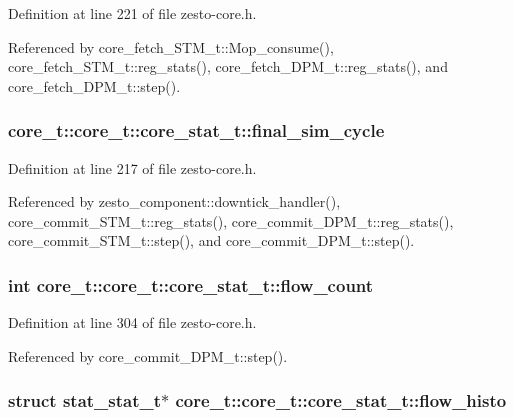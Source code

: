 Definition at line 221 of file zesto-core.h.

Referenced by core\_\-fetch\_\-STM\_\-t::Mop\_\-consume(), core\_\-fetch\_\-STM\_\-t::reg\_\-stats(), core\_\-fetch\_\-DPM\_\-t::reg\_\-stats(), and core\_\-fetch\_\-DPM\_\-t::step().
\subsubsection[{final\_\-sim\_\-cycle}]{ core\_\-t::core\_\-t::core\_\-stat\_\-t::final\_\-sim\_\-cycle}\label{structcore__t_1_1core__stat__t_5bdfc20ac509b4f10d9ac1b28f8c5a35}




Definition at line 217 of file zesto-core.h.

Referenced by zesto\_\-component::downtick\_\-handler(), core\_\-commit\_\-STM\_\-t::reg\_\-stats(), core\_\-commit\_\-DPM\_\-t::reg\_\-stats(), core\_\-commit\_\-STM\_\-t::step(), and core\_\-commit\_\-DPM\_\-t::step().
\subsubsection[{flow\_\-count}]{\setlength{\rightskip}{0pt plus 5cm}int core\_\-t::core\_\-t::core\_\-stat\_\-t::flow\_\-count}\label{structcore__t_1_1core__stat__t_6d36cc9bbc761b78f6147cf11a99b3a8}




Definition at line 304 of file zesto-core.h.

Referenced by core\_\-commit\_\-DPM\_\-t::step().
\subsubsection[{flow\_\-histo}]{\setlength{\rightskip}{0pt plus 5cm}struct {\bf stat\_\-stat\_\-t}$\ast$ core\_\-t::core\_\-t::core\_\-stat\_\-t::flow\_\-histo\hspace{0.3cm}{\tt  [read]}}\label{structcore__t_1_1core__stat__t_fedfecd010b8b8c8f91aac0e0e8700d6}




